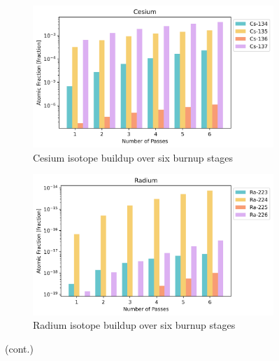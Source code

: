 \begin{figure}[H]\ContinuedFloat
\centering

\begin{subfigure}{0.95\textwidth}
  \includegraphics[width=\linewidth]{figures/compositions/caesium}
  \caption{Cesium isotope buildup over six burnup stages}
  \label{fig:cs}
\end{subfigure}%


\begin{subfigure}{0.95\textwidth}
  \includegraphics[width=\linewidth]{figures/compositions/radium}
  \caption{Radium isotope buildup over six burnup stages}
  \label{fig:ra}
\end{subfigure}%

\caption[]{(cont.)}
\end{figure}


